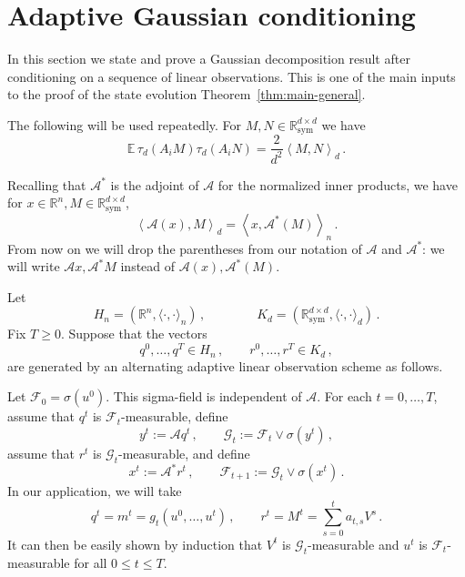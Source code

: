 \documentclass[11pt]{article}
\theoremstyle{definition}
\theoremstyle{remark}
\numberwithin{equation}{section}
\numberwithin{theorem}{section}
\newcommand{\R}{\mathbb R}
\newcommand{\E}{\mathbb E}
\newcommand{\ip}[2]{\left\langle #1,#2\right\rangle}
\newcommand{\taud}{\tau_d}
\newcommand{\cA}{\mathcal A}
\newcommand{\Symm}{\mathbb{R}^{d \times d}_{\mathrm{sym}}}
\begin{document}
\section{Adaptive Gaussian conditioning}
\label{sec:gaussian-conditioning}
In this section we state and prove a Gaussian decomposition result after conditioning on a sequence of linear observations. This is one of the main inputs to the proof of the state evolution Theorem~\ref{thm:main-general}.  

The following will be used repeatedly.
For $M,N\in\Symm$ we have
\begin{equation}\label{eq:cov-goe}
  \E\,\taud(A_i M)\taud(A_i N)=\frac{2}{d^2}\ip{M}{N}_d\,.
\end{equation}

Recalling that $\cA^*$ is the adjoint of $\cA$ for the normalized inner products, we have for $x \in \R^n, M\in \Symm$,
\begin{equation}
 \ip{\cA(x)}{M}_d =  \ip{x}{\cA^*(M)}_n\,.
\end{equation}
From now on we will drop the parentheses from  our notation of $\cA$ and $\cA^*$: we will write $\cA x, \cA^*M$ instead of $\cA(x),\cA^*(M)$. 

Let
\begin{equation}
H_n=(\mathbb R^n,\langle\cdot,\cdot\rangle_n)\,, \qquad\qquad K_d=(\Symm,\langle\cdot,\cdot\rangle_d)\,.
\end{equation}
Fix $T\ge 0$. Suppose that the vectors
\[
  q^0,\ldots,q^T\in H_n\,,
  \qquad
  r^0,\ldots,r^T\in K_d\,,
\]
are generated by an alternating adaptive linear observation scheme as follows. 

Let $\mathscr F_0=\sigma(u^0)$. This sigma-field is independent of $\mathcal A$. 
For each $t=0,\ldots,T$, assume that $q^t$ is
$\mathscr F_t$-measurable, define
\begin{equation}\label{eq:sigma_fieldG}
  y^t:=\mathcal A q^t\,,
  \qquad
  \mathscr G_t:=\mathscr F_t\vee \sigma(y^t)\,,
\end{equation}
assume that $r^t$ is $\mathscr G_t$-measurable, and define
\begin{equation}\label{eq:sigma_fieldF}
  x^{t}:=\mathcal A^* r^t\,,
  \qquad
  \mathscr F_{t+1}:=\mathscr G_t\vee \sigma(x^{t})\,.
\end{equation}
%
In our application, we will take
\[
q^t = m^t = g_t(u^0,\ldots,u^t)\,,
\qquad
r^t = M^t = \sum_{s=0}^t a_{t,s} V^{s}\,.
\]  
 It can then be easily shown by induction that $V^t$ is $\mathscr G_t$-measurable and $u^{t}$ is $\mathscr F_t$-measurable for all $0 \le t\le T$.
\end{document}
